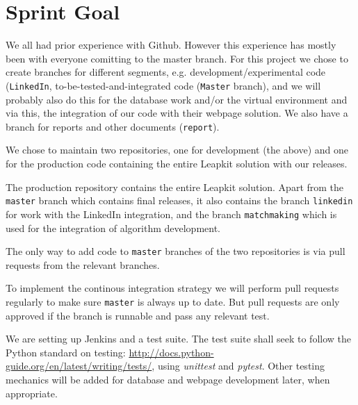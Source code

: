 \section{Sprint Goal}

We all had prior experience with Github. However this experience has mostly been with everyone comitting to the master branch. For this project we chose to create branches for different segments, e.g. development/experimental code (\texttt{LinkedIn}, to-be-tested-and-integrated code (\texttt{Master} branch), and we will probably also do this for the database work and/or the virtual environment and via this, the integration of our code with their webpage solution.
We also have a branch for reports and other documents (\texttt{report}).

We chose to maintain two repositories, one for development (the above) and one for the production code containing the entire Leapkit solution with our releases.

The production repository contains the entire Leapkit solution. Apart from the \texttt{master}
branch which contains final releases, it also contains the branch \texttt{linkedin} for work with the LinkedIn integration, and the branch \texttt{matchmaking} which is used for the integration of algorithm development.

The only way to add code to \texttt{master} branches of the two repositories is via pull requests from the relevant branches.

To implement the continous integration strategy we will perform pull requests regularly
to make sure \texttt{master} is always up to date. But pull requests are only approved if the branch is runnable and pass any relevant test.

We are setting up Jenkins and a test suite. The test suite shall seek to follow the Python standard on testing: \url{http://docs.python-guide.org/en/latest/writing/tests/}, using \textit{unittest} and \textit{pytest}. Other testing mechanics will be added for database and webpage development later, when appropriate.